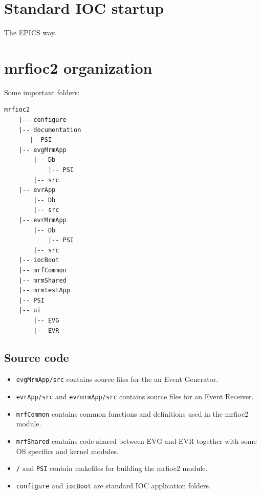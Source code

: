 \documentclass[12pt,a4paper]{article}
\let\stdsection\section
\renewcommand\section{\newpage\stdsection}
\begin{document}
\section{Standard IOC startup}
The EPICS way.

\section{mrfioc2 organization}\label{sec:Source code organization}
Some important folders:
\begin{verbatim}
mrfioc2
    |-- configure
    |-- documentation
       |--PSI
    |-- evgMrmApp
        |-- Db
            |-- PSI
        |-- src
    |-- evrApp
        |-- Db
        |-- src
    |-- evrMrmApp
        |-- Db
            |-- PSI
        |-- src
    |-- iocBoot
    |-- mrfCommon
    |-- mrmShared
    |-- mrmtestApp
    |-- PSI
    |-- ui
        |-- EVG
        |-- EVR
\end{verbatim}

\subsection{Source code}
\begin{itemize}
\item 
	\texttt{evgMrmApp/src} contains source files for the an Event Generator.
\item 
	\texttt{evrApp/src} and \texttt{evrmrmApp/src} contains source files for an Event Receiver.
\item 
	\texttt{mrfCommon} contains common functions and definitions used in the mrfioc2 module. 
\item 
	\texttt{mrfShared} contains code shared between EVG and EVR together with some OS specifics and kernel modules.
\item 
	\texttt{/} and \texttt{PSI} contain makefiles for building the mrfioc2 module.
\item 
	\texttt{configure} and \texttt{iocBoot} are standard IOC application folders.
\end{itemize}
\end{document}

